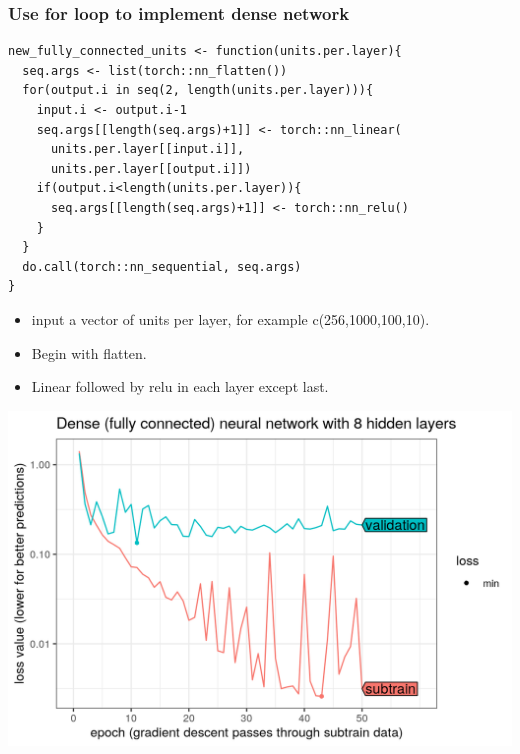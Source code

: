 \documentclass{beamer}
\begin{document}
\begin{frame}[fragile]
  \frametitle{Use for loop to implement dense network}
\begin{verbatim}
new_fully_connected_units <- function(units.per.layer){
  seq.args <- list(torch::nn_flatten())
  for(output.i in seq(2, length(units.per.layer))){
    input.i <- output.i-1
    seq.args[[length(seq.args)+1]] <- torch::nn_linear(
      units.per.layer[[input.i]], 
      units.per.layer[[output.i]])
    if(output.i<length(units.per.layer)){
      seq.args[[length(seq.args)+1]] <- torch::nn_relu()
    }
  }
  do.call(torch::nn_sequential, seq.args)
}
\end{verbatim}
  \begin{itemize}
  \item input a vector of units per layer, for example c(256,1000,100,10).
  \item Begin with flatten.
  \item Linear followed by relu in each layer except last.
  \end{itemize}
\end{frame}
 
\begin{frame}
  \includegraphics[width=\textwidth]{figure-validation-loss-dense}
\end{frame}
 
\end{document}
